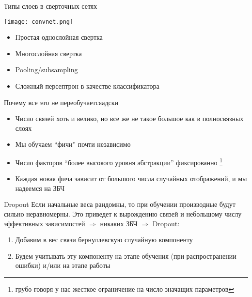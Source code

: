 \documentclass[14pt, fleqn, xcolor={dvipsnames, table}]{beamer}
\begin{document}
\begin{frame}{Типы слоев в сверточных сетях}
\begin{center}\texttt{[image: convnet.png]}\end{center}
\begin{itemize}
\item Простая однослойная свертка 
\item Многослойная свертка
\item Pooling/subsampling
\item Сложный персептрон в качестве классификатора
\end{itemize}
\end{frame}

\begin{frame}{Почему все это не переобучается}{адски}
\small
\begin{itemize}
  \item Число связей хоть и велико, но все же не такое большое как в полносвязных слоях
  \item Мы обучаем ``фичи'' почти независимо
  \item Число факторов ``более высокого уровня абстракции'' фиксированно \footnote{грубо говоря у нас жесткое ограничение на число значащих параметров}
  \item Каждая новая фича зависит от большого числа случайных отображений, и мы надеемся на ЗБЧ
\end{itemize}
\end{frame}

\begin{frame}{Dropout}
\small
Если начальные веса рандомны, то при обучении производные будут сильно неравномерны. Это приведет к вырождению связей и небольшому числу эффективных зависимостей $\Rightarrow$ никаких ЗБЧ $\Rightarrow$ Dropout:
\begin{enumerate}
  \item Добавим в вес связи бернуллевскую случайную компоненту
  \item Будем учитывать эту компоненту на этапе обучения (при распространении ошибки) и/или на этапе работы
\end{enumerate}
\end{frame}
\end{document}
